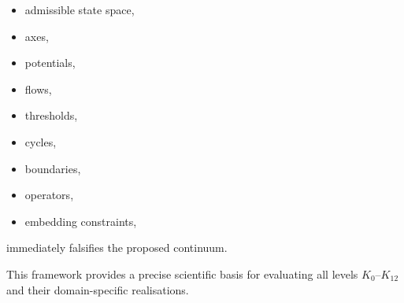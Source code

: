 \begin{itemize}
    \item admissible state space,
    \item axes,
    \item potentials,
    \item flows,
    \item thresholds,
    \item cycles,
    \item boundaries,
    \item operators,
    \item embedding constraints,
\end{itemize}

immediately falsifies the proposed continuum.

This framework provides a precise scientific basis for evaluating all
levels $K_0$--$K_{12}$ and their domain-specific realisations.
